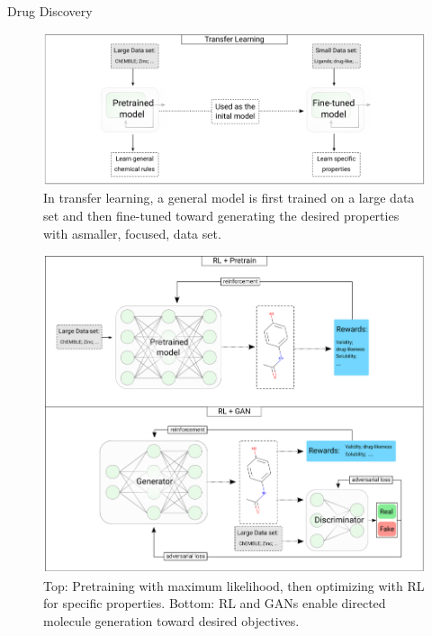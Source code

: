 \begin{frame}[allowframebreaks]{Drug Discovery}
    \begin{figure}
        \centering
        \includegraphics[height=0.65\textheight,width=1\textwidth,keepaspectratio]{images/science/drug-discovery-transfer-learning.png}
        \caption*{In transfer learning, a general model is ﬁrst trained on a large data set and then ﬁne-tuned toward generating the desired properties with asmaller, focused, data set.}
    \end{figure}

    \framebreak
    
    \begin{figure}
        \centering
        \includegraphics[height=0.74\textheight,width=1\textwidth,keepaspectratio]{images/science/drug-discovery-rl-pretrain-gan.png}
        {\footnotesize
        \caption*{Top: Pretraining with maximum likelihood, then optimizing with RL for specific properties. Bottom: RL and GANs enable directed molecule generation toward desired objectives.}
        }
    \end{figure}


\end{frame}

